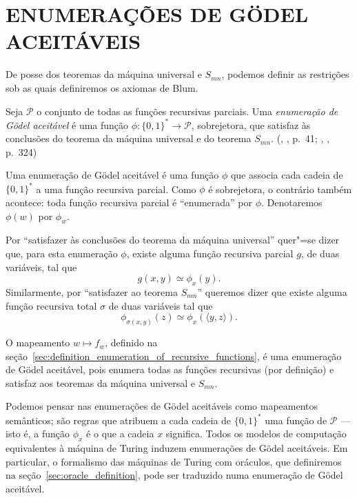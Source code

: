 \section{ENUMERAÇÕES DE GÖDEL ACEITÁVEIS}
\label{sec:acceptable_godel_numbering}

De posse dos teoremas da máquina universal e $S_{mn}$,
podemos definir as restrições sob as quais definiremos os axiomas de Blum.

\begin{definition}
    Seja $\mathcal P$ o conjunto de todas as funções recursivas parciais.
    Uma \emph{enumeração de Gödel aceitável}
    é uma função $\phi: \{0, 1\}^* \to \mathcal P$, sobrejetora,
    que satisfaz às conclusões do teorema da máquina universal
    e do teorema $S_{mn}$.
    (\citeauthor{Rogers1987}, \citeyear{Rogers1987}, p.~41;
    \citeauthor{Blum1967}, \citeyear{Blum1967}, p.~324)
\end{definition}

Uma enumeração de Gödel aceitável é uma função $\phi$ que associa
cada cadeia de $\{0, 1\}^*$ a uma função recursiva parcial.
Como $\phi$ é sobrejetora,
o contrário também acontece:
toda função recursiva parcial é ``enumerada'' por $\phi$.
Denotaremos $\phi(w)$ por $\phi_w$.

Por ``satisfazer às conclusões do teorema da máquina universal''
quer"=se dizer que,
para esta enumeração $\phi$,
existe alguma função recursiva parcial $g$, de duas variáveis,
tal que
\begin{equation*}
    g(x, y) \simeq \phi_x(y).
\end{equation*}
Similarmente, por ``satisfazer ao teorema $S_{mn}$'' queremos dizer que
existe alguma função recursiva total $\sigma$ de duas variáveis tal que
\begin{equation*}
    \phi_{\sigma(x, y)}(z) \simeq \phi_x(\langle y, z \rangle).
\end{equation*}

\begin{example}
    O mapeamento $w \mapsto f_w$,
    definido na seção~\ref{sec:definition_enumeration_of_recursive_functions},
    é uma enumeração de Gödel aceitável,
    pois enumera todas as funções recursivas (por definição)
    e satisfaz aos teoremas da máquina universal e $S_{mn}$.
\end{example}

Podemos pensar nas enumerações de Gödel aceitáveis
como mapeamentos semânticos;
são regras que atribuem a cada cadeia de $\{0, 1\}^*$
uma função de $\mathcal P$ --- isto é,
a função $\phi_x$ é o que a cadeia $x$ significa.
Todos os modelos de computação equivalentes à máquina de Turing
induzem enumerações de Gödel aceitáveis.
Em particular,
o formalismo das máquinas de Turing com oráculos,
que definiremos na seção~\ref{sec:oracle_definition},
pode ser traduzido numa enumeração de Gödel aceitável.

